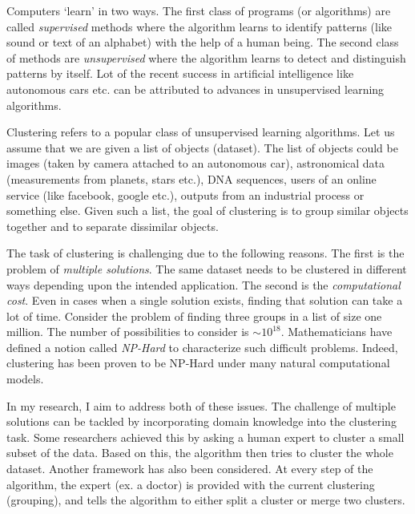\documentclass[12pt]{article}
\begin{document}
\linespread{0.901}

Computers `learn' in two ways. The first class of programs (or algorithms) are called \textit{supervised} methods where the algorithm learns to identify patterns (like sound or text of an alphabet) with the help of a human being.  The second class of methods are \textit{unsupervised} where the algorithm learns to detect and distinguish patterns by itself. Lot of the recent success in artificial intelligence like autonomous cars etc. can be attributed to advances in unsupervised learning algorithms. 

Clustering refers to a popular class of unsupervised learning algorithms. Let us assume that we are given a list of objects (dataset). The list of objects could be images (taken by camera attached to an autonomous car), astronomical data (measurements from planets, stars etc.), DNA sequences, users of an online service (like facebook, google etc.), outputs from an industrial process or something else. Given such a list, the goal of clustering is to group similar objects together and to separate dissimilar objects. 

The task of clustering is challenging due to the following reasons. The first is the problem of \textit{multiple solutions}. The same dataset needs to be clustered in different ways depending upon the intended application. The second is the \textit{computational cost}. Even in cases when a single solution exists, finding that solution can take a lot of time. Consider the problem of finding three groups in a list of size one million. The number of possibilities to consider is $\sim 10^{18}$. Mathematicians have defined a notion called \textit{NP-Hard} to characterize such difficult problems. Indeed, clustering has been proven to be NP-Hard under many natural computational models.

In my research, I aim to address both of these issues. The challenge of multiple solutions can be tackled by incorporating domain knowledge into the clustering task. Some researchers achieved this by asking a human expert to cluster a small subset of the data. Based on this, the algorithm then tries to cluster the whole dataset.  Another framework has also been considered. At every step of the algorithm, the expert (ex. a doctor) is provided with the current clustering (grouping), and tells the algorithm to either split a cluster or merge two clusters. 
\end{document}
